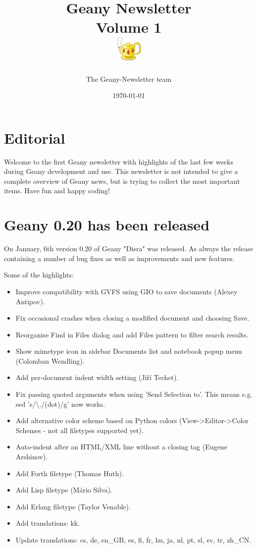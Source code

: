 \documentclass[%
paper=a4,%
fontsize=11pt,%
twoside=false,%
DIV18,
headsepline,
plainheadsepline,
footsepline,
plainfootsepline,
parskip=half,%
openany,%
]{scrartcl}
\title{Geany Newsletter \\[1ex]
	\small{Volume 1} \\[1ex]
	\includegraphics{img/geany.png}}
\author{The Geany-Newsletter team}
\date{\today}
\begin{document}
\maketitle{}
\tableofcontents{}

\section*{Editorial}

Welcome to the first Geany newsletter with highlights of the last few weeks
during Geany development and use. This newsletter is not intended to give a complete
overview of Geany news, but is trying to collect the most important items.
Have fun and happy coding!

\newpage{}
\section{Geany 0.20 has been released}

On January, 6th version 0.20 of Geany "Disra" was released. As always
the release containing a number of bug fixes as well as
improvements and new features.

Some of the highlights:

\begin{itemize}
	\item Improve compatibility with GVFS using GIO to save documents (Alexey Antipov).
	\item Fix occasional crashes when closing a modified document and choosing Save.
	\item Reorganise Find in Files dialog and add Files pattern to filter search results.
	\item Show mimetype icon in sidebar Documents list and notebook popup menu (Colomban Wendling).
	\item Add per-document indent width setting (Jiří Techet).
	\item Fix passing quoted arguments when using 'Send Selection to'. This means e.g. sed 's/\textbackslash{}./(dot)/g' now works.
	\item Add alternative color scheme based on Python colors (View->Editor->Color Schemes - not all filetypes supported yet).
	\item Auto-indent after an HTML/XML line without a closing tag (Eugene Arshinov).
	\item Add Forth filetype (Thomas Huth).
	\item Add Lisp filetype (Mário Silva).
	\item Add Erlang filetype (Taylor Venable).
	\item Add translations: kk.
	\item Update translations: cs, de, en\_GB, es, fi, fr, hu, ja, nl, pt, sl, sv, tr, zh\_CN.
\end{itemize}
\end{document}
